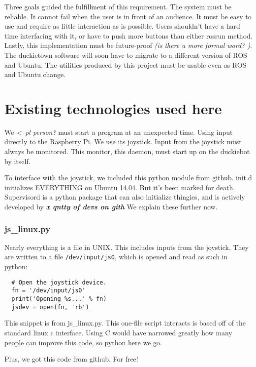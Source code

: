 \documentclass[titlepage]{article}
\begin{document}
Three goals guided the fulfillment of this requirement. The system must be reliable. It cannot fail when the user is in front of an audience. It must be easy to use and require as little interaction as is possible. Users shouldn't have a hard time interfacing with it, or have to push more buttons than either rosrun method. Lastly, this implementation must be future-proof \textit{(is there a more formal word? )}. The duckietown software will soon have to migrate to a different version of ROS and Ubuntu. The utilities produced by this project must be usable even as ROS and Ubuntu change. 
\section{Existing technologies used here}
We \textit{<--pl person?} must start a program at an unexpected time. Using input directly to the Raspberry Pi. We use its joystick. Input from the joystick must always be monitored. This monitor, this daemon, must start up on the duckiebot by itself. 

To interface with the joystick, we included this python module from github. 
init.d initializes EVERYTHING on Ubuntu 14.04. But it's been marked for death.
Supervisord is a python package that can also initialize thingies, and is actively developed by \textbf{\textit{x qntty of devs on gith}}
We explain these further now. 
\subsubsection{js_linux.py}
Nearly everything is a file in UNIX. This includes inputs from the joystick. They are written to a file \texttt{/dev/input/js0}, which is opened and read as such in python:


\begin{lstlisting}
  # Open the joystick device.
  fn = '/dev/input/js0'
  print('Opening %s...' % fn)
  jsdev = open(fn, 'rb')
\end{lstlisting}

This snippet is from js_linux.py. This one-file script interacts is based off of the standard linux c interface. Using C would have narrowed greatly how many people can improve this code, so python here we go. 

Plus, we got this code from github. For free!
\end{document}
